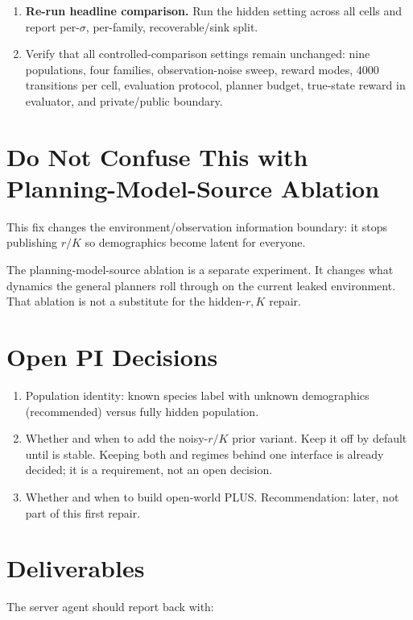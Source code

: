\documentclass[11pt]{article}
\newcommand{\code}[1]{\texttt{\detokenize{#1}}}
\begin{document}
\begin{enumerate}
  \item \textbf{Re-run headline comparison.} Run the hidden setting across all
  cells and report per-\(\sigma\), per-family, recoverable/sink split.

  \item Verify that all controlled-comparison settings remain unchanged: nine
  populations, four families, observation-noise sweep, reward modes, 4000
  transitions per cell, evaluation protocol, planner budget, true-state reward
  in evaluator, and private/public boundary.
\end{enumerate}

\section{Do Not Confuse This with Planning-Model-Source Ablation}

This fix changes the environment/observation information boundary: it stops
publishing \(r/K\) so demographics become latent for everyone.

The planning-model-source ablation is a separate experiment. It changes what
dynamics the general planners roll through on the current leaked environment.
That ablation is not a substitute for the hidden-\(r,K\) repair.

\section{Open PI Decisions}

\begin{enumerate}
  \item Population identity: known species label with unknown demographics
  (recommended) versus fully hidden population.
  \item Whether and when to add the noisy-\(r/K\) prior variant. Keep it off by
  default until \code{hidden} is stable. Keeping both \code{full} and
  \code{hidden} regimes behind one interface is already decided; it is a
  requirement, not an open decision.
  \item Whether and when to build open-world PLUS. Recommendation: later, not
  part of this first repair.
\end{enumerate}

\section{Deliverables}

The server agent should report back with:
\end{document}
